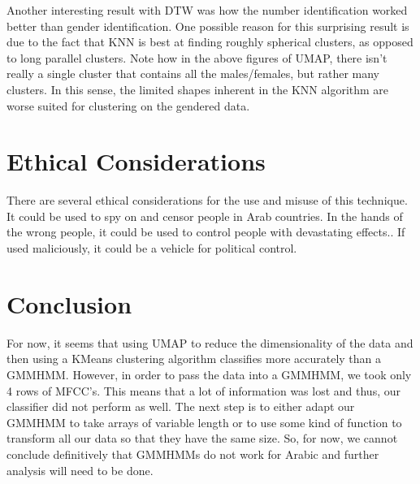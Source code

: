 \documentclass[11pt]{article}
\newcommand{\0}{{\vec  0 }}
\newcommand{\1}{{\mathbbm{  1} }}
\begin{document}
    Another interesting result with DTW was how the number identification worked better than gender identification. One possible reason for this surprising result is due to the fact that KNN is best at finding roughly spherical clusters, as opposed to long parallel clusters. Note how in the above figures of UMAP, there isn't really a single cluster that contains all the males/females, but rather many clusters. In this sense, the limited shapes inherent in the KNN algorithm are worse suited for clustering on the gendered data. 
    
    \section{Ethical Considerations}
    There are several ethical considerations for the use and misuse of this technique. It could be used to spy on and censor people in Arab countries. In the hands of the wrong people, it could be used to control people with devastating effects.. If used maliciously, it could be a vehicle for political control. 
    
    \section{Conclusion}
    For now, it seems that using UMAP to reduce the dimensionality of the data and then using a KMeans clustering algorithm classifies more accurately than a GMMHMM. However, in order to pass the data into a GMMHMM, we took only 4 rows of MFCC’s. This means that a lot of information was lost and thus, our classifier did not perform as well. The next step is to either adapt our GMMHMM to take arrays of variable length or to use some kind of function to transform all our data so that they have the same size. So, for now, we cannot conclude definitively that GMMHMMs do not work for Arabic and further analysis will need to be done.
    

    
    

    
    
\end{document}
